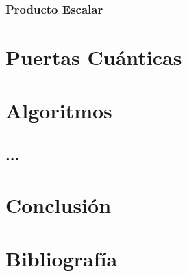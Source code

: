 \documentclass[a4paper]{article}
\numberwithin{equation}{section}
\begin{document}
\subsubsection{Producto Escalar}










\newpage

\section{Puertas Cuánticas}%

\newpage

\section{Algoritmos}

\subsection{...}

\newpage

\section{Conclusión}

\newpage

\section{Bibliografía}

\end{document}
